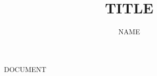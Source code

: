 \documentclass[12pt, letterpaper, twoside]{article}
\title{TITLE}
\author{NAME}
\date{}
\begin{document}
\begin{titlepage}
\maketitle
\end{titlepage}

DOCUMENT 
\end{document}

